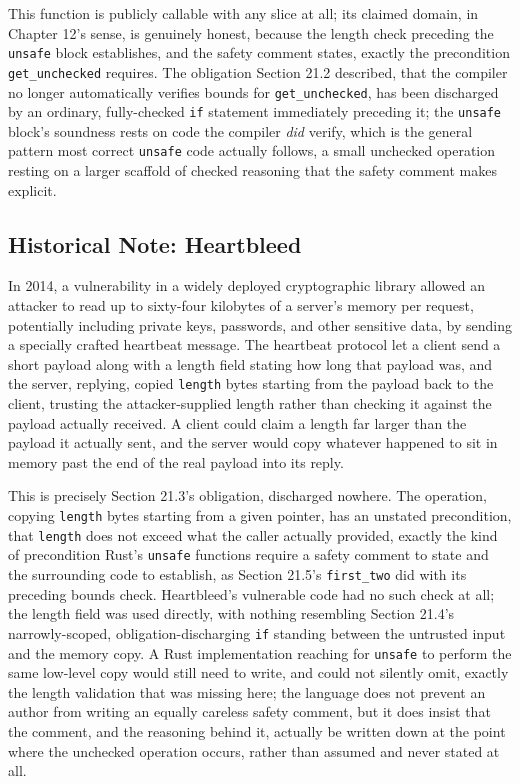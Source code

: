 \documentclass[11pt]{book}
\begin{document}
This function is publicly callable with any slice at all; its claimed domain, in Chapter 12's sense, is genuinely honest, because the length check preceding the \texttt{unsafe} block establishes, and the safety comment states, exactly the precondition \texttt{get\_unchecked} requires. The obligation Section 21.2 described, that the compiler no longer automatically verifies bounds for \texttt{get\_unchecked}, has been discharged by an ordinary, fully-checked \texttt{if} statement immediately preceding it; the \texttt{unsafe} block's soundness rests on code the compiler \emph{did} verify, which is the general pattern most correct \texttt{unsafe} code actually follows, a small unchecked operation resting on a larger scaffold of checked reasoning that the safety comment makes explicit.

\subsection*{Historical Note: Heartbleed}

In 2014, a vulnerability in a widely deployed cryptographic library allowed an attacker to read up to sixty-four kilobytes of a server's memory per request, potentially including private keys, passwords, and other sensitive data, by sending a specially crafted heartbeat message. The heartbeat protocol let a client send a short payload along with a length field stating how long that payload was, and the server, replying, copied \texttt{length} bytes starting from the payload back to the client, trusting the attacker-supplied length rather than checking it against the payload actually received. A client could claim a length far larger than the payload it actually sent, and the server would copy whatever happened to sit in memory past the end of the real payload into its reply.

This is precisely Section 21.3's obligation, discharged nowhere. The operation, copying \texttt{length} bytes starting from a given pointer, has an unstated precondition, that \texttt{length} does not exceed what the caller actually provided, exactly the kind of precondition Rust's \texttt{unsafe} functions require a safety comment to state and the surrounding code to establish, as Section 21.5's \texttt{first\_two} did with its preceding bounds check. Heartbleed's vulnerable code had no such check at all; the length field was used directly, with nothing resembling Section 21.4's narrowly-scoped, obligation-discharging \texttt{if} standing between the untrusted input and the memory copy. A Rust implementation reaching for \texttt{unsafe} to perform the same low-level copy would still need to write, and could not silently omit, exactly the length validation that was missing here; the language does not prevent an author from writing an equally careless safety comment, but it does insist that the comment, and the reasoning behind it, actually be written down at the point where the unchecked operation occurs, rather than assumed and never stated at all.
\end{document}
